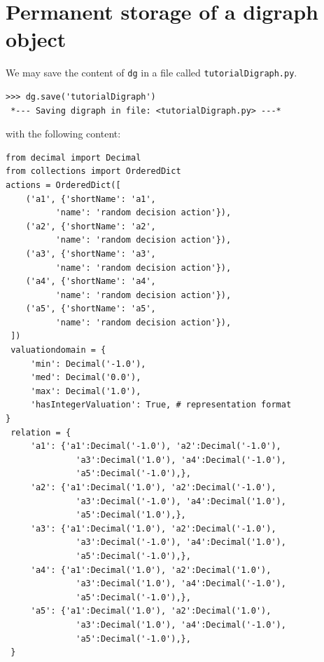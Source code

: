 \section{Permanent storage of a digraph object}
\label{sec:1.3}                   
We may save the content of \texttt{dg} in a file called \texttt{tutorialDigraph.py}.
\begin{lstlisting}
>>> dg.save('tutorialDigraph')
 *--- Saving digraph in file: <tutorialDigraph.py> ---*
\end{lstlisting}
with the following content:
\begin{lstlisting}[caption={A stored digraph instance},label=list:1.2]
from decimal import Decimal
from collections import OrderedDict
actions = OrderedDict([
    ('a1', {'shortName': 'a1',
          'name': 'random decision action'}),
    ('a2', {'shortName': 'a2',
          'name': 'random decision action'}),
    ('a3', {'shortName': 'a3',
          'name': 'random decision action'}),
    ('a4', {'shortName': 'a4',
          'name': 'random decision action'}),
    ('a5', {'shortName': 'a5',
          'name': 'random decision action'}),
 ])
 valuationdomain = {
     'min': Decimal('-1.0'),
     'med': Decimal('0.0'),
     'max': Decimal('1.0'),
     'hasIntegerValuation': True, # representation format
}
 relation = {
     'a1': {'a1':Decimal('-1.0'), 'a2':Decimal('-1.0'),
              'a3':Decimal('1.0'), 'a4':Decimal('-1.0'),
              'a5':Decimal('-1.0'),},
     'a2': {'a1':Decimal('1.0'), 'a2':Decimal('-1.0'),
              'a3':Decimal('-1.0'), 'a4':Decimal('1.0'),
              'a5':Decimal('1.0'),},
     'a3': {'a1':Decimal('1.0'), 'a2':Decimal('-1.0'),
              'a3':Decimal('-1.0'), 'a4':Decimal('1.0'),
              'a5':Decimal('-1.0'),},
     'a4': {'a1':Decimal('1.0'), 'a2':Decimal('1.0'),
              'a3':Decimal('1.0'), 'a4':Decimal('-1.0'),
              'a5':Decimal('-1.0'),},
     'a5': {'a1':Decimal('1.0'), 'a2':Decimal('1.0'),
              'a3':Decimal('1.0'), 'a4':Decimal('-1.0'),
              'a5':Decimal('-1.0'),},
 }
\end{lstlisting}

